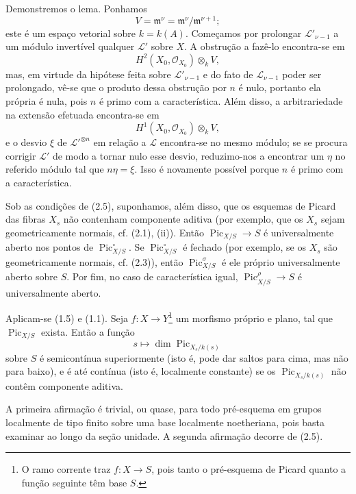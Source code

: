 Demonstremos o lema. Ponhamos
\[
V=\mathfrak m^\nu=\mathfrak m^\nu/\mathfrak m^{\nu+1} ;
\]
este é um espaço vetorial sobre $k=k(A)$. Começamos por prolongar
$\mathcal L'_{\nu-1}$ a um módulo invertível qualquer $\mathcal L'$ sobre $X$.
A obstrução a fazê-lo encontra-se em
\[
H^2(X_0,\mathcal O_{X_0})\otimes_k V,
\]
mas, em virtude da hipótese feita sobre $\mathcal L'_{\nu-1}$ e do fato de
$\mathcal L_{\nu-1}$ poder ser prolongado, vê-se que o produto dessa obstrução
por $n$ é nulo, portanto ela própria é nula, pois $n$ é primo com a
característica. Além disso, a arbitrariedade na extensão efetuada encontra-se
em
\[
H^1(X_0,\mathcal O_{X_0})\otimes_k V,
\]
e o desvio $\xi$ de $\mathcal L'^{\otimes n}$ em relação a $\mathcal L$
encontra-se no mesmo módulo; se se procura corrigir $\mathcal L'$ de modo a
tornar nulo esse desvio, reduzimo-nos a encontrar um $\eta$ no referido módulo
tal que $n\eta=\xi$. Isso é novamente possível porque $n$ é primo com a
característica.

 Sob as condições de (2.5), suponhamos, além disso, que os
esquemas de Picard das fibras $X_s$ não contenham componente aditiva (por
exemplo, que os $X_s$ sejam geometricamente normais, cf. (2.1), (ii)). Então
$\operatorname{Pic}_{X/S}\longrightarrow S$ é universalmente aberto nos pontos
de $\operatorname{Pic}_{X/S}^\circ$. Se
$\operatorname{Pic}_{X/S}^\circ$ é fechado (por exemplo, se os $X_s$ são
geometricamente normais, cf. (2.3)), então
$\operatorname{Pic}_{X/S}^\sigma$ é ele próprio universalmente aberto sobre
$S$. Por fim, no caso de característica igual,
$\operatorname{Pic}_{X/S}^\rho\longrightarrow S$ é universalmente aberto.

Aplicam-se (1.5) e (1.1).
 Seja $f:X\longrightarrow Y$\footnote{O ramo corrente
traz $f:X\longrightarrow S$, pois tanto o pré-esquema de Picard quanto a função
seguinte têm base $S$.} um morfismo próprio e plano, tal que
$\operatorname{Pic}_{X/S}$ exista. Então a função
\[
s\longmapsto\dim\operatorname{Pic}_{X_s/k(s)}
\]
sobre $S$ é semicontínua superiormente (isto é, pode dar saltos para cima, mas
não para baixo), e é até contínua (isto é, localmente constante) se os
$\operatorname{Pic}_{X_s/k(s)}$ não contêm componente aditiva.

A primeira afirmação é trivial, ou quase, para todo pré-esquema em grupos
localmente de tipo finito sobre uma base localmente noetheriana, pois basta
examinar ao longo da seção unidade. A segunda afirmação decorre de (2.5).

